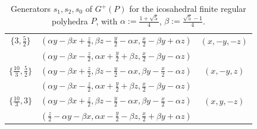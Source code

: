 \documentclass[12pt]{article}
\theoremstyle{definition}\newtheorem{definition}{Definition}[section]
\begin{document}
\begin{table}
\begin{center}
\begin{tabular}{ |c|c|c| }
 \hline
 \rule{0pt}{2.25ex} $\{3,\frac{5}{2}\}$ & $(\alpha y - \beta x + \frac{z}{2}, \beta z - \frac{y}{2} - \alpha x, \frac{x}{2} - \beta y + \alpha z)$ & $(x,-y,-z)$  \\ [0.25ex]
 \rule{0pt}{2.25ex}  & $(\alpha y - \beta x - \frac{z}{2}, \alpha x + \frac{y}{2} + \beta z, \frac{x}{2} - \beta y - \alpha z)$ &   \\ [0.25ex]
 \hline
 \rule{0pt}{2.25ex} $\{\frac{10}{3},\frac{5}{2}\}$ & $(\alpha y - \beta x + \frac{z}{2}, \beta z - \frac{y}{2} - \alpha x, \beta y - \frac{x}{2} - \alpha z)$ & $(x,-y,z)$  \\ [0.25ex]
 \rule{0pt}{2.25ex}  & $(\alpha y - \beta x - \frac{z}{2}, \alpha x + \frac{y}{2} + \beta z, \frac{x}{2} - \beta y - \alpha z)$ &   \\ [0.25ex]
 \hline
 \rule{0pt}{2.25ex} $\{\frac{10}{3},3\}$ & $(\alpha y - \beta x + \frac{z}{2}, \beta z - \frac{y}{2} - \alpha x, \beta y - \frac{x}{2} - \alpha z)$ & $(x,y,-z)$  \\ [0.25ex]
 \rule{0pt}{2.25ex}  & $(\frac{z}{2} - \alpha y - \beta x, \alpha x - \frac{y}{2} - \beta z, \frac{x}{2} + \beta y + \alpha z)$ &   \\ [0.25ex]
 \hline
\end{tabular}
\end{center}
\caption{Generators $s_1,s_2, s_0$ of $G^+(P)$ for the icosahedral finite regular polyhedra $P$, with $\alpha:= \frac{1+\sqrt{5}}{4}$, $\beta:= \frac{\sqrt{5}-1}{4}$.}
\label{gplusfinite2}
\end{table}
\end{document}
